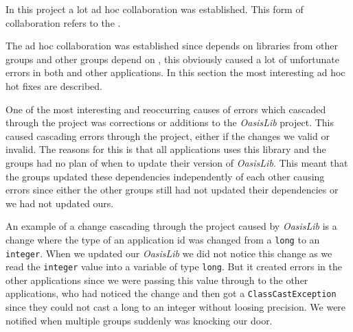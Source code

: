 In this project a lot ad hoc collaboration was established.
This form of collaboration refers to the \Cref{}.\\ 

The ad hoc collaboration was established since \launcher depends on libraries from other groups and other groups depend on \launcher, this obviously caused a lot of unfortunate errors in both \launcher and other applications.
In this section the most interesting ad hoc hot fixes are described.

One of the most interesting and reoccurring causes of errors which cascaded through the \giraf project was corrections or additions to the \textit{OasisLib} project.
This caused cascading errors through the project, either if the changes we valid or invalid.
The reasons for this is that all applications uses this library and the groups had no plan of when to update their version of \textit{OasisLib}.
This meant that the groups updated these dependencies independently of each other causing errors since either the other groups still had not updated their dependencies or we had not updated ours.

An example of a change cascading through the project caused by \textit{OasisLib} is a change where the type of an application id was changed from a \lstinline|long| to an \lstinline|integer|.
When we updated our \textit{OasisLib} we did not notice this change as we read the \lstinline|integer| value into a variable of type \lstinline|long|.
But it created errors in the other applications since we were passing this value through to the other applications, who had noticed the change and then got a \lstinline!ClassCastException! since they could not cast a long to an integer without loosing precision.
We were notified when multiple groups suddenly was knocking our door.





